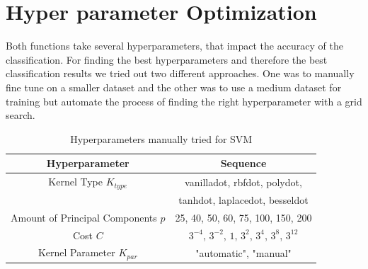 \documentclass[conference]{IEEEtran}
\begin{document}
\section{Hyper parameter Optimization}
Both functions take several hyperparameters, that impact the accuracy of the classification. For finding the best hyperparameters and therefore the best classification results we tried out two different approaches. One was to manually fine tune on a smaller dataset and the other was to use a medium dataset for training but automate the process of finding the right hyperparameter with a grid search.

\begin{table}[htbp]
    \color{maxim}
    \caption{\color{maxim}Hyperparameters manually tried for SVM}
    \begin{center}
    \begin{tabular}{|c|c|}
        \hline
        \textbf{Hyperparameter} & \textbf{Sequence} \\
        \hline
        Kernel Type $K_{type}$ & vanilladot, rbfdot, polydot,\\ 
        & tanhdot, laplacedot, besseldot\\
        \hline
        Amount of Principal Components $p$ & 25, 40, 50, 60, 75, 100, 150, 200\\
        \hline
        Cost $ C $ & $3^{-4}$, $3^{-2}$, $1$, $3^2$, $3^4$, $3^8$, $3^{12}$ \\
        \hline
        Kernel Parameter $K_{par}$ & "automatic", "manual"\\
        \hline
    \end{tabular}
    \label{table:gridParamSVM}
    \end{center}
\end{table}
\end{document}
